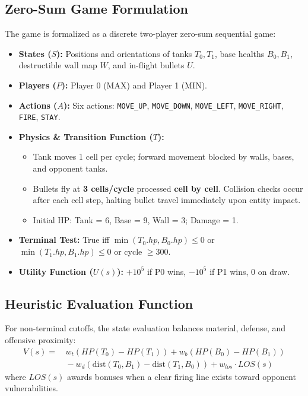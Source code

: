 \documentclass[conference]{IEEEtran}
\begin{document}
\subsection{Zero-Sum Game Formulation}
The game is formalized as a discrete two-player zero-sum sequential game:
\begin{itemize}
    \item \textbf{States ($S$):} Positions and orientations of tanks $T_0, T_1$, base healths $B_0, B_1$, destructible wall map $W$, and in-flight bullets $U$.
    \item \textbf{Players ($P$):} Player 0 (MAX) and Player 1 (MIN).
    \item \textbf{Actions ($A$):} Six actions: \texttt{MOVE\_UP}, \texttt{MOVE\_DOWN}, \texttt{MOVE\_LEFT}, \texttt{MOVE\_RIGHT}, \texttt{FIRE}, \texttt{STAY}.
    \item \textbf{Physics \& Transition Function ($T$):}
    \begin{itemize}
        \item Tank moves 1 cell per cycle; forward movement blocked by walls, bases, and opponent tanks.
        \item Bullets fly at \textbf{3 cells/cycle} processed \textbf{cell by cell}. Collision checks occur after each cell step, halting bullet travel immediately upon entity impact.
        \item Initial HP: Tank = 6, Base = 9, Wall = 3; Damage = 1.
    \end{itemize}
    \item \textbf{Terminal Test:} True iff $\min(T_0.hp, B_0.hp) \le 0$ or $\min(T_1.hp, B_1.hp) \le 0$ or cycle $\ge 300$.
    \item \textbf{Utility Function ($U(s)$):} $+10^5$ if P0 wins, $-10^5$ if P1 wins, $0$ on draw.
\end{itemize}

\subsection{Heuristic Evaluation Function}
For non-terminal cutoffs, the state evaluation balances material, defense, and offensive proximity:
\begin{equation}
\begin{aligned}
    V(s) = &\, w_t (HP(T_0) - HP(T_1)) + w_b (HP(B_0) - HP(B_1)) \\
           &\, - w_d (\text{dist}(T_0, B_1) - \text{dist}(T_1, B_0)) + w_{los} \cdot LOS(s)
\end{aligned}
\end{equation}
where $LOS(s)$ awards bonuses when a clear firing line exists toward opponent vulnerabilities.
\end{document}

